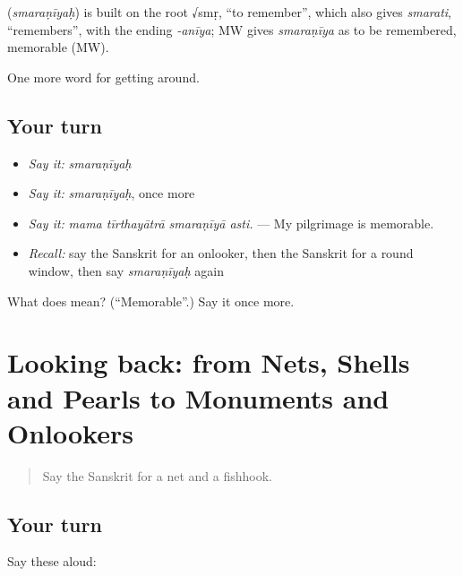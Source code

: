 \begin{cousinweb}
\textbf{} (\emph{smaraṇīyaḥ}) is built on the root √smṛ, \textquotedblleft{}to remember\textquotedblright{}, which also gives \emph{smarati}, \textquotedblleft{}remembers\textquotedblright{}, with the ending \emph{-anīya}; MW gives \emph{smaraṇīya} as to be remembered, memorable (MW).
\end{cousinweb}

\begin{grammarlens}[title={What you've built}]
One more word for getting around.
\end{grammarlens}

\subsection*{Your turn}
\begin{itemize}
\raggedright
  \item \emph{Say it:} \emph{smaraṇīyaḥ}
  \item \emph{Say it:} \emph{smaraṇīyaḥ}, once more
  \item \emph{Say it:} \emph{mama tīrthayātrā smaraṇīyā asti.} — My pilgrimage is memorable.
  \item \emph{Recall:} say the Sanskrit for an onlooker, then the Sanskrit for a round window, then say \emph{smaraṇīyaḥ} again
\end{itemize}

\begin{tcolorbox}[breakable,colback=teal!4,colframe=teal!35!black,title={Before you move on}]
What does  mean? (\textquotedblleft{}Memorable\textquotedblright{}.) Say it once more.
\end{tcolorbox}
\section[(dialogue)]{Looking back: from Nets, Shells and Pearls to Monuments and Onlookers}

\label{lesson:SA-R425-review-418-425}



\begin{quote}
Say the Sanskrit for a net and a fishhook.
\end{quote}

\subsection*{Your turn}
Say these aloud:

